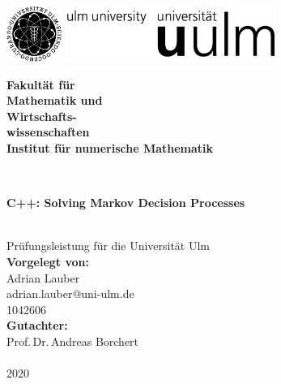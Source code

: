\documentclass[a4paper,12pt,
headsepline,           %
oneside,               %
pointlessnumbers,      %
bibtotoc,              %
BCOR15mm               %
]{scrbook}
\makeatletter
\newcommand{\fullname}{Adrian Lauber}
\newcommand{\email}{adrian.lauber@uni-ulm.de}
\newcommand{\titel}{C++: Solving Markov Decision Processes}
\newcommand{\jahr}{2020}
\newcommand{\matnr}{1042606}
\newcommand{\gutachterA}{Prof.\,Dr.\,Andreas Borchert}
\newcommand{\gutachterB}{}
\newcommand{\betreuer}{}
\newcommand{\fakultaet}{Mathematik und\\Wirtschafts-\\wissenschaften}
\newcommand{\institut}{Institut für numerische Mathematik}
\makeatother
\begin{document}
\frontmatter

\thispagestyle{empty}
\begin{addmargin*}[4mm]{-10mm}

\includegraphics[height=1.8cm]{images/unilogo_bild}
\hfill
\includegraphics[height=1.8cm]{images/unilogo_wort}\\[1em]

{\footnotesize
\hspace*{115mm}\parbox[t]{35mm}{\bfseries Fakultät für\\
\fakultaet\\
\mdseries \institut}\\[2cm]

\parbox{140mm}{\bfseries \LARGE \titel}\\[2.5em]
{\footnotesize Prüfungsleistung für die Universität Ulm}\\[3em]

{\footnotesize \bfseries Vorgelegt von:}\\
{\footnotesize \fullname\\ \email}\\ \matnr\\[2em]
{\footnotesize \bfseries Gutachter:}\\                     
{\footnotesize \gutachterA\\ \gutachterB}\\[2em]
{\footnotesize \jahr}
}
\end{addmargin*}
\end{document}

